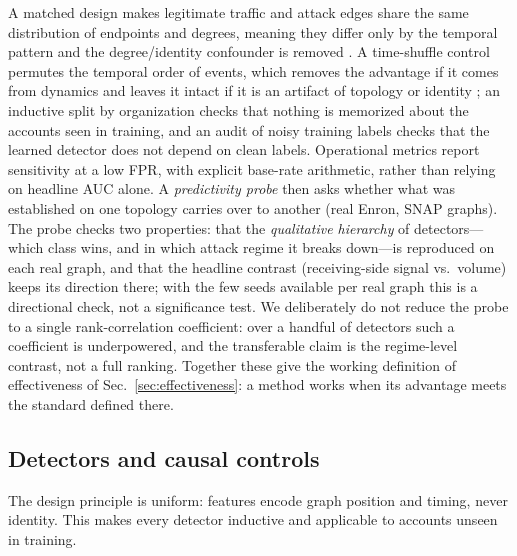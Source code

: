 A matched design makes legitimate traffic and attack edges share the same
distribution of endpoints and degrees, meaning they differ only by the temporal pattern and the
degree/identity confounder is removed \citep{arp2022dos}. A time-shuffle control permutes the temporal order of
events, which removes the advantage if it comes from dynamics and leaves it intact if it is an artifact of
topology or identity \citep{pendlebury2019tesseract}; an inductive split by organization checks that nothing is memorized about
the accounts seen in training, and an audit of noisy training labels checks that the learned detector does not
depend on clean labels. Operational metrics report sensitivity at a low FPR, with explicit base-rate
arithmetic, rather than relying on headline AUC alone. A \emph{predictivity probe} then asks whether what was established on one
topology carries over to another (real Enron, SNAP graphs). The probe checks two properties: that the
\emph{qualitative hierarchy} of detectors---which class wins, and in which attack regime it breaks down---is
reproduced on each real graph, and that the headline contrast (receiving-side signal vs.\ volume) keeps its
direction there; with the few seeds available per real graph this is a directional check, not a
significance test. We deliberately do not reduce the probe to a single rank-correlation
coefficient: over a handful of detectors such a coefficient is underpowered, and the transferable claim is the
regime-level contrast, not a full ranking. Together these give the working definition of effectiveness of
Sec.~\ref{sec:effectiveness}: a method works when its advantage meets the standard defined there.

\subsection{Detectors and causal controls}
\label{sec:m-detectors}
The design principle is uniform: features encode graph position and timing, never identity. This makes every detector
inductive and applicable to accounts unseen in training.

